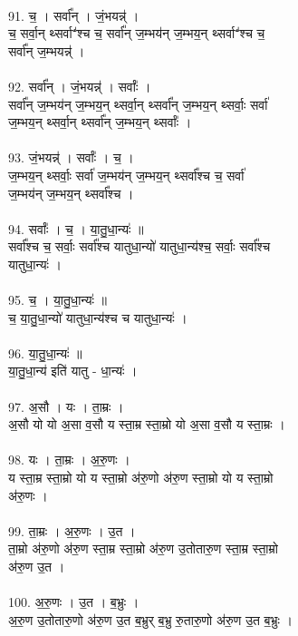 \\
91. च॒ । सर्वा᳚न् । जं॒भयन्न्॑ ।\\
च॒ सर्वा॒न् थ्सर्वाꣲ॑श्च च॒ सर्वा᳚न् ज॒म्भय॑न् ज॒म्भय॒न् थ्सर्वाꣲ॑श्च च॒\\
सर्वा᳚न् ज॒म्भयन्न्॑ ।\\
\\
92. सर्वा᳚न् । जं॒भयन्न्॑ । सर्वाः᳚ ।\\
सर्वा᳚न् ज॒म्भय॑न् ज॒म्भय॒न् थ्सर्वा॒न् थ्सर्वा᳚न् ज॒म्भय॒न् थ्सर्वाः॒ सर्वा॑\\
ज॒म्भय॒न् थ्सर्वा॒न् थ्सर्वा᳚न् ज॒म्भय॒न् थ्सर्वाः᳚ ।\\
\\
93. जं॒भयन्न्॑ । सर्वाः᳚ । च॒ ।\\
ज॒म्भय॒न् थ्सर्वाः॒ सर्वा॑ ज॒म्भय॑न् ज॒म्भय॒न् थ्सर्वा᳚श्च च॒ सर्वा॑\\
ज॒म्भय॑न् ज॒म्भय॒न् थ्सर्वा᳚श्च ।\\
\\
94. सर्वाः᳚ । च॒ । या॒तु॒धा॒न्यः॑ ॥\\
सर्वा᳚श्च च॒ सर्वाः॒ सर्वा᳚श्च यातुधा॒न्यो॑ यातुधा॒न्य॑श्च॒ सर्वाः॒ सर्वा᳚श्च\\
यातुधा॒न्यः॑ ।\\
\\
95. च॒ । या॒तु॒धा॒न्यः॑ ॥\\
च॒ या॒तु॒धा॒न्यो॑ यातुधा॒न्य॑श्च च यातुधा॒न्यः॑ ।\\
\\
96. या॒तु॒धा॒न्यः॑ ॥\\
या॒तु॒धा॒न्य॑ इति॑ यातु - धा॒न्यः॑ ।\\
\\
97. अ॒सौ । यः । ता॒म्रः ।\\
अ॒सौ यो यो अ॒सा व॒सौ य स्ता॒म्र स्ता॒म्रो यो अ॒सा व॒सौ य स्ता॒म्रः ।\\
\\
98. यः । ता॒म्रः । अ॒रु॒णः ।\\
य स्ता॒म्र स्ता॒म्रो यो य स्ता॒म्रो अ॑रु॒णो अ॑रु॒ण स्ता॒म्रो यो य स्ता॒म्रो\\
अ॑रु॒णः ।\\
\\
99. ता॒म्रः । अ॒रु॒णः । उ॒त ।\\
ता॒म्रो अ॑रु॒णो अ॑रु॒ण स्ता॒म्र स्ता॒म्रो अ॑रु॒ण उ॒तोतारु॒ण स्ता॒म्र स्ता॒म्रो\\
अ॑रु॒ण उ॒त ।\\
\\
100. अ॒रु॒णः । उ॒त । ब॒भ्रुः ।\\
अ॒रु॒ण उ॒तोतारु॒णो अ॑रु॒ण उ॒त ब॒भ्रुर् ब॒भ्रु रु॒तारु॒णो अ॑रु॒ण उ॒त ब॒भ्रुः ।\\
